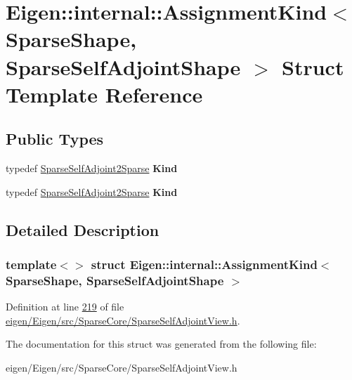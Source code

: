 \hypertarget{struct_eigen_1_1internal_1_1_assignment_kind_3_01_sparse_shape_00_01_sparse_self_adjoint_shape_01_4}{}\section{Eigen\+:\+:internal\+:\+:Assignment\+Kind$<$ Sparse\+Shape, Sparse\+Self\+Adjoint\+Shape $>$ Struct Template Reference}
\label{struct_eigen_1_1internal_1_1_assignment_kind_3_01_sparse_shape_00_01_sparse_self_adjoint_shape_01_4}
\subsection*{Public Types}
\begin{DoxyCompactItemize}
\item 
\mbox{\label{struct_eigen_1_1internal_1_1_assignment_kind_3_01_sparse_shape_00_01_sparse_self_adjoint_shape_01_4_a292d40f0abb62123012cc833d536d1d7}} 
typedef \hyperlink{struct_eigen_1_1internal_1_1_sparse_self_adjoint2_sparse}{Sparse\+Self\+Adjoint2\+Sparse} {\bfseries Kind}
\item 
\mbox{\label{struct_eigen_1_1internal_1_1_assignment_kind_3_01_sparse_shape_00_01_sparse_self_adjoint_shape_01_4_a292d40f0abb62123012cc833d536d1d7}} 
typedef \hyperlink{struct_eigen_1_1internal_1_1_sparse_self_adjoint2_sparse}{Sparse\+Self\+Adjoint2\+Sparse} {\bfseries Kind}
\end{DoxyCompactItemize}


\subsection{Detailed Description}
\subsubsection*{template$<$$>$\newline
struct Eigen\+::internal\+::\+Assignment\+Kind$<$ Sparse\+Shape, Sparse\+Self\+Adjoint\+Shape $>$}



Definition at line \hyperlink{eigen_2_eigen_2src_2_sparse_core_2_sparse_self_adjoint_view_8h_source_l00219}{219} of file \hyperlink{eigen_2_eigen_2src_2_sparse_core_2_sparse_self_adjoint_view_8h_source}{eigen/\+Eigen/src/\+Sparse\+Core/\+Sparse\+Self\+Adjoint\+View.\+h}.



The documentation for this struct was generated from the following file\+:\begin{DoxyCompactItemize}
\item 
eigen/\+Eigen/src/\+Sparse\+Core/\+Sparse\+Self\+Adjoint\+View.\+h\end{DoxyCompactItemize}
